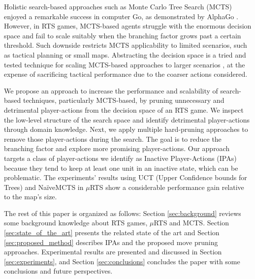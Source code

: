 \documentclass[conference]{IEEEtran}
\newcommand{\mRTS}{$\mu$RTS}
\begin{document}
Holistic search-based approaches such as Monte Carlo Tree Search (MCTS) \cite{browne_survey_2012} enjoyed a remarkable success in computer Go, as demonstrated by AlphaGo \cite{silver_mastering_2016}.
 However, in RTS games, MCTS-based agents struggle with the enormous decision space and fail to scale suitably when the branching factor grows past a certain threshold. Such downside restricts MCTS applicability to limited scenarios, such as tactical planning or small maps. Abstracting the decision space is a tried and tested technique for scaling MCTS-based approaches to larger scenarios \cite{ontanon_survey_2013}, 
at the expense of sacrificing tactical performance due to the coarser actions considered.

We propose an approach to increase the performance and scalability of search-based techniques, particularly MCTS-based, by pruning unnecessary and detrimental player-actions from the decision space of an RTS game. 
We inspect the low-level structure of the search space and identify detrimental player-actions through domain knowledge. Next, we apply multiple hard-pruning approaches to remove those player-actions during the search. The goal is to reduce the branching factor and explore more promising player-actions. Our approach targets a class of player-actions we identify as Inactive Player-Actions (IPAs) because they tend to keep at least one unit in an inactive state, which can be problematic. The experiments' results using UCT (Upper Confidence bounds for Trees) and NaïveMCTS in \mRTS{} show a considerable performance gain relative to the map's size.

 

The rest of this paper is organized as follows: Section \ref{sec:background} reviews some background knowledge about RTS games, \mRTS{} and MCTS. Section \ref{sec:state_of_the_art} presents the related state of the art and Section \ref{sec:proposed_method} describes IPAs and the proposed move pruning approaches. Experimental results are presented and discussed in Section \ref{sec:experiments}, and Section \ref{sec:conclusions} concludes the paper with some conclusions and future perspectives.
\end{document}
